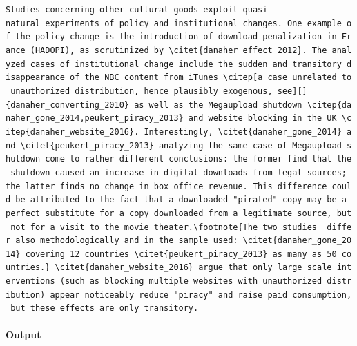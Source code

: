 \documentclass[
  11pt,
]{article}
\begin{document}
\texttt{Studies\ concerning\ other\ cultural\ goods\ exploit\ quasi-natural\ experiments\ of\ policy\ and\ institutional\ changes.\ One\ example\ of\ the\ policy\ change\ is\ the\ introduction\ of\ download\ penalization\ in\ France\ (HADOPI),\ as\ scrutinized\ by\ \textbackslash{}citet\{danaher\_effect\_2012\}.\ The\ analyzed\ cases\ of\ institutional\ change\ include\ the\ sudden\ and\ transitory\ disappearance\ of\ the\ NBC\ content\ from\ iTunes\ \textbackslash{}citep{[}a\ case\ unrelated\ to\ unauthorized\ distribution,\ hence\ plausibly\ exogenous,\ see{]}{[}{]}\{danaher\_converting\_2010\}\ as\ well\ as\ the\ Megaupload\ shutdown\ \textbackslash{}citep\{danaher\_gone\_2014,peukert\_piracy\_2013\}\ and\ website\ blocking\ in\ the\ UK\ \textbackslash{}citep\{danaher\_website\_2016\}.\ Interestingly,\ \textbackslash{}citet\{danaher\_gone\_2014\}\ and\ \textbackslash{}citet\{peukert\_piracy\_2013\}\ analyzing\ the\ same\ case\ of\ Megaupload\ shutdown\ come\ to\ rather\ different\ conclusions:\ the\ former\ find\ that\ the\ shutdown\ caused\ an\ increase\ in\ digital\ downloads\ from\ legal\ sources;\ the\ latter\ finds\ no\ change\ in\ box\ office\ revenue.\ This\ difference\ could\ be\ attributed\ to\ the\ fact\ that\ a\ downloaded\ "pirated"\ copy\ may\ be\ a\ perfect\ substitute\ for\ a\ copy\ downloaded\ from\ a\ legitimate\ source,\ but\ not\ for\ a\ visit\ to\ the\ movie\ theater.\textbackslash{}footnote\{The\ two\ studies\ \ differ\ also\ methodologically\ and\ in\ the\ sample\ used:\ \textbackslash{}citet\{danaher\_gone\_2014\}\ covering\ 12\ countries\ \textbackslash{}citet\{peukert\_piracy\_2013\}\ as\ many\ as\ 50\ countries.\}\ \textbackslash{}citet\{danaher\_website\_2016\}\ argue\ that\ only\ large\ scale\ interventions\ (such\ as\ blocking\ multiple\ websites\ with\ unauthorized\ distribution)\ appear\ noticeably\ reduce\ "piracy"\ and\ raise\ paid\ consumption,\ but\ these\ effects\ are\ only\ transitory.}

\hypertarget{output}{%
\paragraph{Output}\label{output}}
\end{document}
